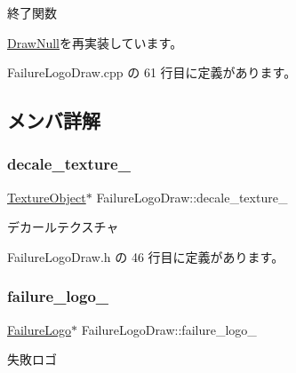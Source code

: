 終了関数 



\mbox{\hyperlink{class_draw_null_a12d44e341c7364b5ab9cdd661dc16187}{Draw\+Null}}を再実装しています。



 Failure\+Logo\+Draw.\+cpp の 61 行目に定義があります。



\subsection{メンバ詳解}
\mbox{\label{class_failure_logo_draw_a02463e67fa2053739c667bb1213e1b9e}} 
\subsubsection{\texorpdfstring{decale\+\_\+texture\+\_\+}{decale\_texture\_}}
{\footnotesize\ttfamily \mbox{\hyperlink{class_texture_object}{Texture\+Object}}$\ast$ Failure\+Logo\+Draw\+::decale\+\_\+texture\+\_\+\hspace{0.3cm}{\ttfamily [private]}}



デカールテクスチャ 



 Failure\+Logo\+Draw.\+h の 46 行目に定義があります。

\mbox{\label{class_failure_logo_draw_aa6b60e289acc232d5bd1bc5a656a2551}} 
\subsubsection{\texorpdfstring{failure\+\_\+logo\+\_\+}{failure\_logo\_}}
{\footnotesize\ttfamily \mbox{\hyperlink{class_failure_logo}{Failure\+Logo}}$\ast$ Failure\+Logo\+Draw\+::failure\+\_\+logo\+\_\+\hspace{0.3cm}{\ttfamily [private]}}



失敗ロゴ 



